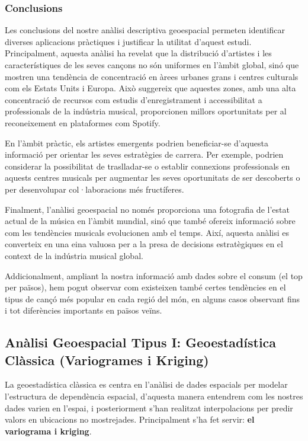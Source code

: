 \subsubsection{Conclusions}

Les conclusions del nostre anàlisi descriptiva geoespacial permeten identificar diverses aplicacions pràctiques i justificar la utilitat d'aquest estudi. Principalment, aquesta anàlisi ha revelat que la distribució d'artistes i les característiques de les seves cançons no són uniformes en l'àmbit global, sinó que mostren una tendència de concentració en àrees urbanes grans i centres culturals com els Estats Units i Europa. Això suggereix que aquestes zones, amb una alta concentració de recursos com estudis d'enregistrament i accessibilitat a professionals de la indústria musical, proporcionen millors oportunitats per al reconeixement en plataformes com Spotify.

En l'àmbit pràctic, els artistes emergents podrien beneficiar-se d'aquesta informació per orientar les seves estratègies de carrera. Per exemple, podrien considerar la possibilitat de traslladar-se o establir connexions professionals en aquests centres musicals per augmentar les seves oportunitats de ser descoberts o per desenvolupar col·laboracions més fructíferes.

Finalment, l'anàlisi geoespacial no només proporciona una fotografia de l'estat actual de la música en l'àmbit mundial, sinó que també ofereix informació sobre com les tendències musicals evolucionen amb el temps. Així, aquesta anàlisi es converteix en una eina valuosa per a la presa de decisions estratègiques en el context de la indústria musical global.

Addicionalment, ampliant la nostra informació amb dades sobre el consum (el top per països), hem pogut observar com existeixen també certes tendències en el tipus de cançó més popular en cada regió del món, en alguns casos observant fins i tot diferències importants en països veïns. 

\subsection{Anàlisi Geoespacial Tipus I: Geoestadística Clàssica (Variogrames i Kriging)}

La geoestadística clàssica es centra en l'anàlisi de dades espacials per modelar l'estructura de dependència espacial, d'aquesta manera entendrem com les nostres dades varien en l'espai, i posteriorment s'han realitzat interpolacions per predir valors en ubicacions no mostrejades. Principalment s'ha fet servir: \textbf{el variograma i kriging}.


